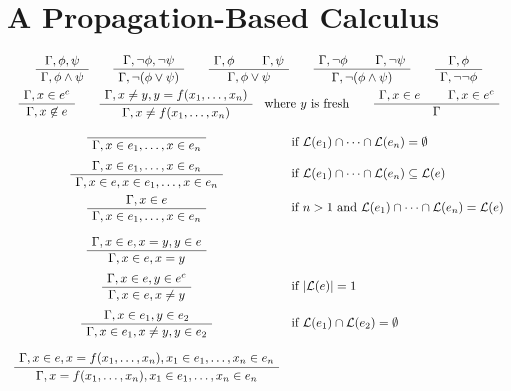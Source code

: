 
\section{A Propagation-Based Calculus}
\label{sect:calculus}

\begin{table}
  \begin{gather*}
    \infer
    {\seqq{\phi \wedge \psi}}
    {\seqq{\phi, \psi}}
    \qquad
    \infer
    {\seqq{ \neg(\phi \vee \psi)}}
    {\seqq{ \neg\phi, \neg\psi}}
    \qquad
    \inferii
    {\seqq{\phi \vee \psi}}
    {\seqq{\phi}}{\seqq{\psi}}
    \qquad
    \inferii
    {\seqq{\neg(\phi \wedge \psi)}}
    {\seqq{\neg\phi}}{\seqq{\neg\psi}}
    \qquad
    \infer
    {\seqq{ \neg\neg\phi}}
    {\seqq{\phi}}
    \\
    \infer
    {\seqq{x \not\in e}}
    {\seqq{x \in e^c}}
    \qquad
    \infer[\text{where~} y \text{~is fresh}]
    {\seqq{x \not= f(x_1, \ldots, x_n)}}
    {\seqq{x \not= y, y = f(x_1, \ldots, x_n)}}
    \qquad
    \inferii
    {\seqq{}}
    {\seqq{x \in e}}{\seqq{x \in e^c}}
    \\[2ex]
    \begin{array}{cl}
      \infer
      {\seqq{x \in e_1, \ldots, x \in e_n}}
      {}
      &
        \text{if~} \lang{e_1} \cap \cdots \cap\lang{e_n} = \emptyset
      \\[2ex]
      \infer
      {\seqq{x \in e, x \in e_1, \ldots, x \in e_n}}
      {\seqq{x \in e_1, \ldots, x \in e_n}}
      &
        \text{if~} \lang{e_1} \cap \cdots \cap\lang{e_n} \subseteq \lang{e}
      \\[2.5ex]
      \infer
      {\seqq{x \in e_1, \ldots, x \in e_n}}
      {\seqq{x \in e}}
      &
        \text{if~} n > 1 \text{~and~} \lang{e_1} \cap \cdots \cap\lang{e_n} = \lang{e}
      \\[4ex]
      \infer
      {\seqq{x \in e, x = y}}
      {\seqq{x \in e, x = y, y \in e}}
      \\[3ex]
      \infer
      {\seqq{x \in e, x \not= y}}
      {\seqq{x \in e, y \in e^c}}
      &
        \text{if~} |\lang{e}| = 1
      \\[3ex]
      \infer
      {\seqq{x \in e_1, x \not= y, y \in e_2}}
      {\seqq{x \in e_1, y \in e_2}}
      &
        \text{if~} \lang{e_1} \cap \lang{e_2} = \emptyset
      \\[4ex]
      \infer
      {\seqq{x = f(x_1, \ldots, x_n), x_1 \in e_1, \ldots, x_n \in e_n}}
      {\seqq{x \in e, x = f(x_1, \ldots, x_n), x_1 \in e_1, \ldots, x_n \in e_n}}

\end{array}
\end{gather*}
\end{table}
